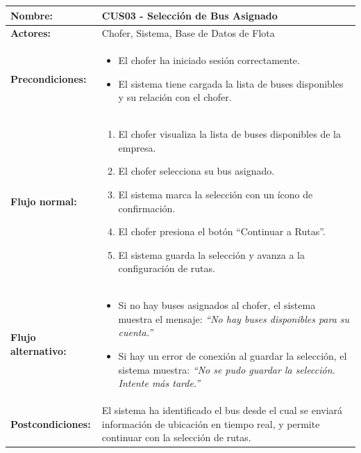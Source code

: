 \documentclass[12pt]{article}
\begin{document}
    \clearpage
    \begin{table}[!h]
    \centering
    \begin{tabular}{|p{3.5cm}|p{11cm}|}
    \hline
    \textbf{Nombre:} & CUS03 - Selección de Bus Asignado \\
    \hline
    \textbf{Actores:} & Chofer, Sistema, Base de Datos de Flota \\
    \hline
    \textbf{Precondiciones:} &
    \begin{itemize}
        \item El chofer ha iniciado sesión correctamente.
        \item El sistema tiene cargada la lista de buses disponibles y su relación con el chofer.
    \end{itemize}
    \\
    \hline
    \textbf{Flujo normal:} &
    \begin{enumerate}
        \item El chofer visualiza la lista de buses disponibles de la empresa.
        \item El chofer selecciona su bus asignado.
        \item El sistema marca la selección con un ícono de confirmación.
        \item El chofer presiona el botón “Continuar a Rutas”.
        \item El sistema guarda la selección y avanza a la configuración de rutas.
    \end{enumerate}
    \\
    \hline
    \textbf{Flujo alternativo:} &
    \begin{itemize}
        \item[1a.] Si no hay buses asignados al chofer, el sistema muestra el mensaje: \textit{“No hay buses disponibles para su cuenta.”}
        \item[4a.] Si hay un error de conexión al guardar la selección, el sistema muestra: \textit{“No se pudo guardar la selección. Intente más tarde.”}
    \end{itemize}
    \\
    \hline
    \textbf{Postcondiciones:} &
    El sistema ha identificado el bus desde el cual se enviará información de ubicación en tiempo real, y permite continuar con la selección de rutas.
    \\
    \hline
    \end{tabular}
    \end{table}
\end{document}
